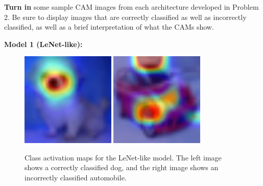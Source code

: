 \documentclass{article}[12pt]
\begin{document}
\textbf{Turn in} some sample CAM images from each architecture developed in Problem 2. Be sure to display images that are correctly classified as well as incorrectly classified, as well as a brief interpretation of what the CAMs show.

\textbf{Model 1 (LeNet-like):}
\begin{figure}[H]
    \centering
        \caption{Class activation maps for the LeNet-like model. The left image shows a correctly classified dog, and the right image shows an incorrectly classified automobile.}
        \includegraphics[width=0.4\textwidth]{CAM_correct_dog4_oldmodel.png}
        \includegraphics[width=0.4\textwidth]{CAM_incorrect_automobile10_oldmodel.png}
\end{figure}
\end{document}
